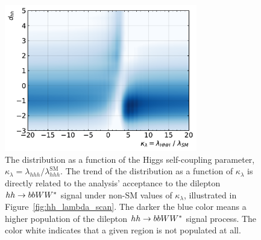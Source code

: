 \begin{figure}[!htb]
    \begin{center}
        \includegraphics[width=0.75\textwidth]{figures/search_hh/results/dhh_vs_lambda}
        \caption{
            The \dhh distribution as a function of the Higgs self-coupling parameter, $\kappa_{\lambda} = \lambda_{hhh} / \lambda_{hhh}^{\text{SM}}$.
            The trend of the \dhh distribution as a function of $\kappa_{\lambda}$ is directly related to the analysis'
            acceptance to the dilepton $hh \rightarrow bbWW^*$ signal under non-SM values of $\kappa_{\lambda}$,
            illustrated in Figure~\ref{fig:hh_lambda_scan}.
            The darker the blue color means a higher population of the dilepton $hh \rightarrow bbWW^*$ signal process.
            The color white indicates that a given region is not populated at all.
        }
        \label{fig:dhh_vs_lambda}
    \end{center}
\end{figure}
